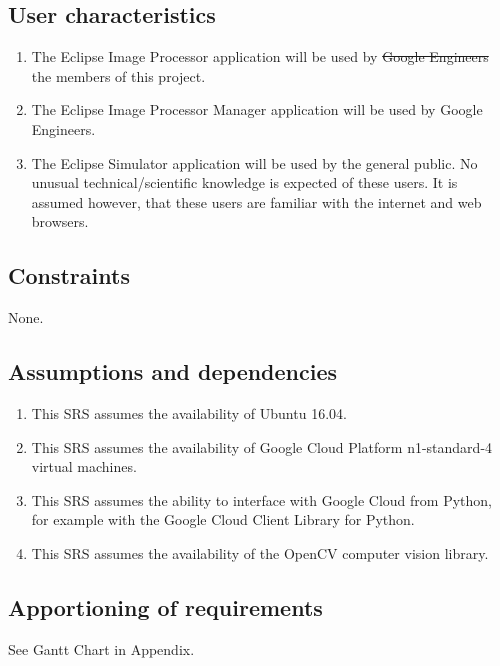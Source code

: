 \documentclass[10pt, onecolumn, draftclsnofoot, letterpaper, compsoc]{IEEEtran}
\begin{document}
\subsection{User characteristics}
	\begin{enumerate}
		\item The Eclipse Image Processor application will be used by 
			\sout{Google Engineers} the members of this project.

		\item The Eclipse Image Processor Manager application will be used by 
			Google Engineers.

		\item The Eclipse Simulator application will be used by the
			general public. No unusual technical/scientific knowledge is
			expected of these users. It is assumed however, that these users
			are familiar with the internet and web browsers.
	\end{enumerate}

\subsection{Constraints}
None.

\subsection{Assumptions and dependencies}
	\begin{enumerate}
		\item This SRS assumes the availability of Ubuntu 16.04.
		
		\item This SRS assumes the availability of Google Cloud Platform 
		n1-standard-4 virtual machines.
		
		\item This SRS assumes the ability to interface with Google Cloud from
		Python, for example with the Google Cloud Client Library for Python.
		
		\item This SRS assumes the availability of the OpenCV computer 
		vision library.
	\end{enumerate}

\subsection{Apportioning of requirements}
See Gantt Chart in Appendix.

\newpage
\end{document}
